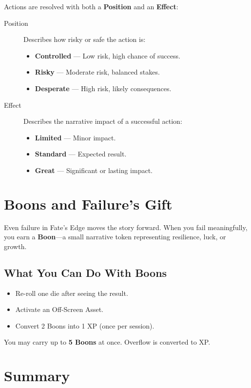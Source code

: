 Actions are resolved with both a \textbf{Position} and an \textbf{Effect}:

\begin{description}
  \item[Position] Describes how risky or safe the action is:
    \begin{itemize}
      \item \textbf{Controlled} — Low risk, high chance of success.
      \item \textbf{Risky} — Moderate risk, balanced stakes.
      \item \textbf{Desperate} — High risk, likely consequences.
    \end{itemize}
  \item[Effect] Describes the narrative impact of a successful action:
    \begin{itemize}
      \item \textbf{Limited} — Minor impact.
      \item \textbf{Standard} — Expected result.
      \item \textbf{Great} — Significant or lasting impact.
    \end{itemize}
\end{description}

\section{Boons and Failure’s Gift}

Even failure in Fate’s Edge moves the story forward. When you fail meaningfully, you earn a \textbf{Boon}—a small narrative token representing resilience, luck, or growth.

\subsection*{What You Can Do With Boons}

\begin{itemize}
  \item Re-roll one die after seeing the result.
  \item Activate an Off-Screen Asset.
  \item Convert 2 Boons into 1 XP (once per session).
\end{itemize}

You may carry up to \textbf{5 Boons} at once. Overflow is converted to XP.

\section{Summary}

